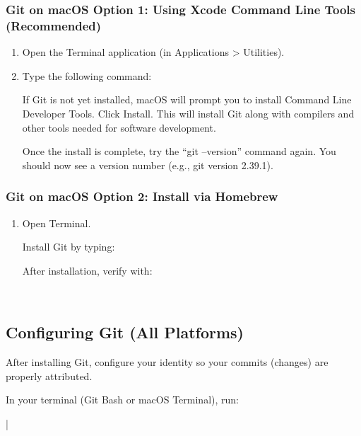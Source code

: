 \subsubsection{Git on macOS Option 1: Using Xcode Command Line Tools (Recommended)}
\begin{enumerate}
\item Open the Terminal application (in Applications > Utilities).
\item Type the following command:
\begin{terminal}
\end{terminal}

If Git is not yet installed, macOS will prompt you to install Command Line Developer Tools. Click Install.
This will install Git along with compilers and other tools needed for software development.

Once the install is complete, try the ``git --version'' command again. You should now see a version number (e.g., git version 2.39.1).
\end{enumerate}

\subsubsection{Git on macOS Option 2: Install via Homebrew}
\begin{enumerate}
\item Open Terminal.

Install Git by typing:
\begin{terminal}
\end{terminal}

After installation, verify with:
\begin{terminal}
\\
\end{terminal}
\end{enumerate}

\subsection*{Configuring Git (All Platforms)}
After installing Git, configure your identity so your commits (changes) are properly attributed.

In your terminal (Git Bash or macOS Terminal), run:
\begin{terminal}
|\\
\end{terminal}

